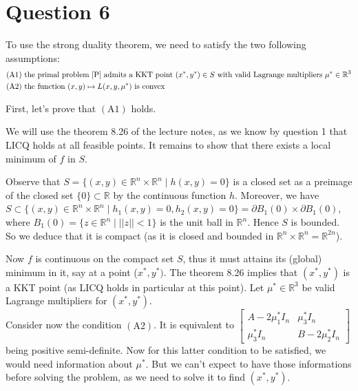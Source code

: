 \documentclass{article}
\newcommand{\R}{\mathbb{R}}
\begin{document}
\section*{Question 6}
To use the strong duality theorem, we need to satisfy the two following assumptions:
\begin{align*}
(\text{A}1) &  \text{ the primal problem \eqref{P} admits a KKT point } (x^*,y^*)\in S \text{ with valid Lagrange multipliers } \mu^*\in \R^3 \\
(\text{A}2) &  \text{ the function } (x,y)\mapsto L(x,y,\mu^*) \text{ is convex}
\end{align*}

\noindent First, let's prove that $(\text{A}1)$ holds.

We will use the theorem 8.26 of the lecture notes, as we know by question 1 that LICQ holds at all feasible points. It remains to show that there exists a local minimum of $f$ in $S$.
 
Observe that $S=\{(x,y)\in\R^n\times\R^n \mid h(x,y)=0\}$ is a closed set as a preimage of the closed set $\{0\}\subset \R$ by the continuous function $h$. Moreover, we have $S\subset \{(x, y)\in\R^n\times\R^n \mid h_1(x,y)=0, h_2(x,y)=0\} = \partial B_1(0)\times \partial B_1(0)$, where $B_1(0)=\{z\in\R^n\mid ||z||<1\}$ is the unit ball in $\R^n$. Hence $S$ is bounded. So we deduce that it is compact (as it is closed and bounded in $\R^n\times\R^n=\R^{2n}$).
 
 Now $f$ is continuous on the compact set $S$, thus it must attains its (global) minimum in it, say at a point ($x^*,y^*)$. The theorem 8.26 implies that $(x^*,y^*)$ is a KKT point (as LICQ holds in particular at this point).
 Let $\mu^*\in\R^3$ be valid Lagrange multipliers for $(x^*,y^*)$.\\
 
\noindent Consider now the condition $(\text{A}2)$. It is equivalent to $\begin{bmatrix} A-2\mu^*_1 I_n & \mu^*_3 I_n \\
\mu^*_3 I_n & B-2\mu^*_2 I_n \end{bmatrix}$ being positive semi-definite. Now for this latter condition to be satisfied, we would need information about $\mu^*$. But we can't expect to have those informations before solving the problem, as we need to solve it to find $(x^*,y^*)$.
 
\end{document}
